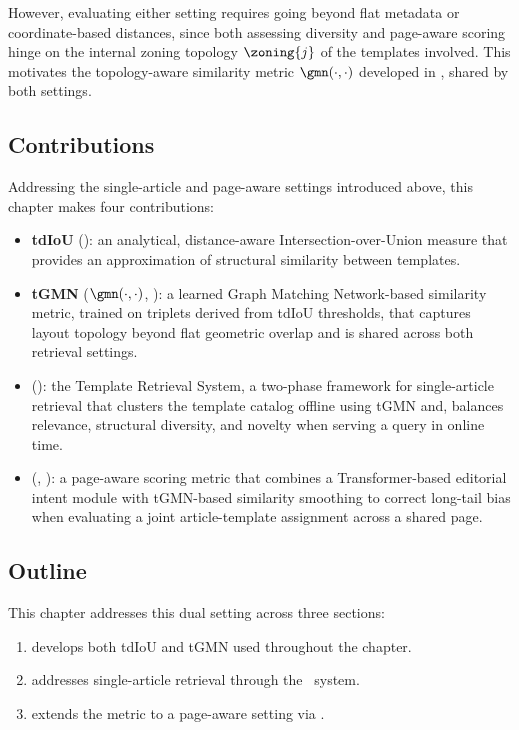 However, evaluating either setting requires going beyond flat metadata or coordinate-based distances, since both assessing diversity and page-aware scoring hinge on the internal zoning topology $\zoning{j}$ of the templates involved. This motivates the topology-aware similarity metric $\gmn(\cdot, \cdot)$ developed in , shared by both settings.

\subsection{Contributions}

Addressing the single-article and page-aware settings introduced above, this chapter makes four contributions:
\begin{itemize}
    \item \textbf{tdIoU} (): an analytical, distance-aware Intersection-over-Union measure that provides an approximation of structural similarity between templates.
    \item \textbf{tGMN} ($\gmn(\cdot,\cdot)$, ): a learned Graph Matching Network-based similarity metric, trained on triplets derived from tdIoU thresholds, that captures layout topology beyond flat geometric overlap and is shared across both retrieval settings.
    \item \textbf{\trs} (): the Template Retrieval System, a two-phase framework for single-article retrieval that clusters the template catalog offline using tGMN and, balances relevance, structural diversity, and novelty when serving a query in online time.
    \item \textbf{\neuralmethod} (\NeuralMethod, ): a page-aware scoring metric that combines a Transformer-based editorial intent module with tGMN-based similarity smoothing to correct long-tail bias when evaluating a joint article-template assignment across a shared page.
\end{itemize}

\subsection*{Outline}

This chapter addresses this dual setting across three sections:
\begin{enumerate}
    \item {} develops both tdIoU and tGMN used throughout the chapter.
    \item {} addresses single-article retrieval through the \trs\ system.
    \item {} extends the metric to a page-aware setting via \neuralmethod.
\end{enumerate}

